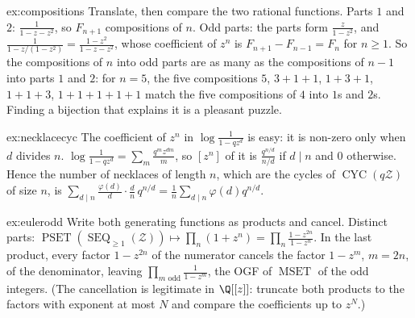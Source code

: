 \begin{solution}{ex:compositions}
\idea Translate, then compare the two rational functions.
\writeup Parts $1$ and $2$: $\frac1{1-z-z^2}$, so $F_{n+1}$ compositions of $n$. Odd parts: the parts form $\frac z{1-z^2}$, and $\frac1{1-z/(1-z^2)}=\frac{1-z^2}{1-z-z^2}$, whose coefficient of
$z^n$ is $F_{n+1}-F_{n-1}=F_n$ for $n\ge1$. So the compositions of $n$ into odd parts are as many as the compositions of $n-1$ into parts $1$ and $2$:
for $n=5$, the five compositions $5$, $3+1+1$, $1+3+1$, $1+1+3$, $1+1+1+1+1$ match the five compositions of $4$ into $1$s and $2$s. Finding a
bijection that explains it is a pleasant puzzle.
\end{solution}

\begin{solution}{ex:necklacecyc}
\idea The coefficient of $z^n$ in $\log\frac1{1-qz^d}$ is easy: it is non-zero only when $d$ divides $n$.
\writeup $\log\frac1{1-qz^d}=\sum_m\frac{q^mz^{dm}}m$, so $[z^n]$ of it is $\frac{q^{n/d}}{n/d}$ if $d\mid n$ and $0$ otherwise. Hence the number of necklaces of length $n$, which are
the cycles of $\operatorname{CYC}(q\mathcal Z)$ of size $n$, is $\sum_{d\mid n}\frac{\varphi(d)}d\cdot\frac d n\,q^{n/d}=\frac1n\sum_{d\mid n}\varphi(d)q^{n/d}$.
\end{solution}

\begin{solution}{ex:eulerodd}
\idea Write both generating functions as products and cancel.
\writeup Distinct parts: $\operatorname{PSET}(\operatorname{SEQ}_{\ge1}(\mathcal Z))\mapsto\prod_n(1+z^n)=\prod_n\frac{1-z^{2n}}{1-z^n}$. In the last product, every factor $1-z^{2n}$ of the numerator cancels the
factor $1-z^m$, $m=2n$, of the denominator, leaving $\prod_{m\text{ odd}}\frac1{1-z^m}$, the OGF of $\operatorname{MSET}$ of the odd integers. (The cancellation is legitimate in
$\Q[[z]]$: truncate both products to the factors with exponent at most $N$ and compare the coefficients up to $z^N$.)
\end{solution}

